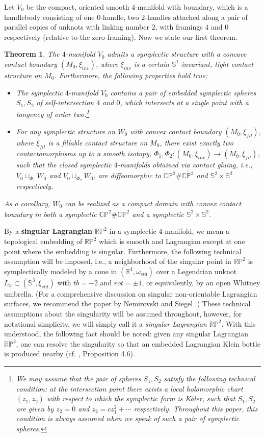 \documentclass[11pt]{amsart}
\theoremstyle{plain}
\newtheorem{theorem}{Theorem}
\numberwithin{theorem}{section}
\theoremstyle{definition}
\newcommand{\C}{{\mathbb C}}
\newcommand{\R}{{\mathbb R}}
\renewcommand{\P}{{\mathbb P}}
\newcommand{\s}{{\mathbb S}}
\begin{document}
Let $V_0$ be the compact, oriented smooth $4$-manifold with boundary, which is a handlebody 
consisting of one $0$-handle, two $2$-handles attached along a pair of parallel copies of unknots 
with linking number $2$, with framings $4$ and $0$ respectively (relative to the zero-framing). 
Now we state our first theorem. 

\begin{theorem}
The $4$-manifold $V_0$ admits a symplectic structure with a concave contact boundary 
$(M_0,\xi_{inv})$, where $\xi_{inv}$ is a certain $\s^1$-invariant, tight contact structure on $M_0$. 
Furthermore, the following properties hold true:
\begin{itemize}
\item [{(1)}] The symplectic $4$-manifold $V_0$ contains a pair of embedded symplectic spheres 
$S_1,S_2$ of self-intersection $4$ and $0$, which intersects at a single point with a tangency of order two.\footnote{We may assume that the pair of spheres $S_1,S_2$ satisfy the following technical condition: at the intersection point there exists a local holomorphic chart $(z_1,z_2)$ with respect to which the symplectic form is K\"{a}ler, such that $S_1,S_2$ are given by $z_2=0$ and $z_2=c z_1^2+\cdots$ respectively. Throughout this paper, this condition is always assumed when we speak of such a pair of symplectic spheres.}
\item [{(2)}] For any symplectic structure on $W_0$ with convex contact boundary 
$(M_0,\xi_{fil})$, where $\xi_{fil}$ is a fillable contact structure on $M_0$, there exist exactly two 
contactomorphisms up to a smooth isotopy, $\Phi_1,\Phi_2: (M_0,\xi_{inv})\rightarrow (M_0, \xi_{fil})$, 
such that the closed symplectic $4$-manifolds obtained via contact gluing, i.e., $V_0\cup_{\Phi_1} W_0$ and $V_0\cup_{\Phi_2} W_0$, are diffeomorphic to $\C\P^2\# \overline{\C\P^2}$ and $\s^2\times \s^2$ respectively. 
\end{itemize}
As a corollary, $W_0$ can be realized as a compact domain with convex contact boundary in both 
a symplectic $\C\P^2\# \overline{\C\P^2}$ and a symplectic $\s^2\times \s^2$. 
\end{theorem}

By a {\bf singular Lagrangian $\R\P^2$} in a symplectic $4$-manifold, we mean a topological embedding of $\R\P^2$ which is smooth and Lagrangian except at one point where the embedding is
singular. Furthermore, the following technical assumption will be imposed, i.e., a neighborhood of
the singular point in $\R\P^2$ is symplectically modeled by a cone in $(\R^4,\omega_{std})$ over 
a Legendrian unknot $L_u\subset (\s^3, \xi_{std})$ with $tb=-2$ and $rot=\pm 1$, or equivalently, by
an open Whitney umbrella. (For a comprehensive discussion on singular non-orientable Lagrangian
surfaces, we recommend the paper by Nemirovski and Siegel \cite{NS}.) These technical assumptions
about the singularity will be assumed throughout, however, for notational simplicity, we will simply
call it a {\it singular Lagrangian $\R\P^2$}. With this understood, the following fact should be noted:
given any singular Lagrangian $\R\P^2$, one can resolve the singularity so that an embedded 
Lagrangian Klein bottle is produced nearby (cf. \cite{NS}, Proposition 4.6).
\end{document}
